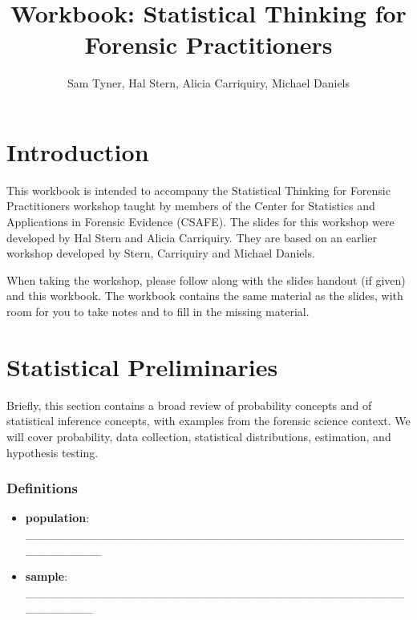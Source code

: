 \documentclass[]{book}
\title{Workbook: Statistical Thinking for Forensic Practitioners}
\author{Sam Tyner, Hal Stern, Alicia Carriquiry, Michael Daniels}
\date{}
\providecommand{\tightlist}{%
  \setlength{\itemsep}{0pt}\setlength{\parskip}{0pt}}
\theoremstyle{definition}
\theoremstyle{definition}
\theoremstyle{remark}
\begin{document}
\maketitle

{
\setcounter{tocdepth}{1}
\tableofcontents
}
\chapter{Introduction}\label{introduction}

This workbook is intended to accompany the Statistical Thinking for
Forensic Practitioners workshop taught by members of the Center for
Statistics and Applications in Forensic Evidence (CSAFE). The slides for
this workshop were developed by Hal Stern and Alicia Carriquiry. They
are based on an earlier workshop developed by Stern, Carriquiry and
Michael Daniels.

When taking the workshop, please follow along with the slides handout
(if given) and this workbook. The workbook contains the same material as
the slides, with room for you to take notes and to fill in the missing
material.

\chapter{Statistical Preliminaries}\label{statistical-preliminaries}

Briefly, this section contains a broad review of probability concepts
and of statistical inference concepts, with examples from the forensic
science context. We will cover probability, data collection, statistical
distributions, estimation, and hypothesis testing. \vspace{-.25in}

\subsection{Definitions}\label{definitions}

\begin{itemize}
\tightlist
\item
  \textbf{population}:
  \_\_\_\_\_\_\_\_\_\_\_\_\_\_\_\_\_\_\_\_\_\_\_\_\_\_\_\_\_\_\_\_\_\_\_\_\_\_\_\_\_\_\_\_\_\_\_\_\_\_\_\_\_\_
\end{itemize}

\vspace{.1in}

\begin{itemize}
\tightlist
\item
  \textbf{sample}:
  \_\_\_\_\_\_\_\_\_\_\_\_\_\_\_\_\_\_\_\_\_\_\_\_\_\_\_\_\_\_\_\_\_\_\_\_\_\_\_\_\_\_\_\_\_\_\_\_\_\_\_\_\_
\end{itemize}
\end{document}
